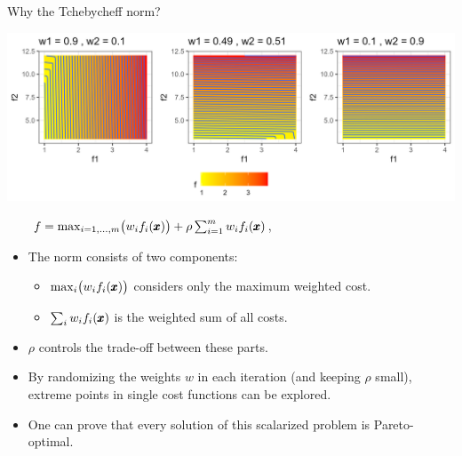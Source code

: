 \documentclass[11pt,compress,t,notes=noshow,xcolor=table]{beamer}
\begin{document}
\begin{vbframe}{Why the Tchebycheff norm?}

\begin{center}
\includegraphics[scale=0.08]{slides/11-multicrit/figure_man/parego_viz.png}
\end{center}

$\qquad f = \max_{i=1,\dots,m}\bigl(w_i f_i(\pmb{x})\bigr) 
    + \rho \sum_{i=1}^m w_i f_i(\pmb{x})$,
\begin{scriptsize}
\begin{itemize}
  \item The norm consists of two components:
    \begin{itemize}
      \item $\max_{i}\bigl(w_i f_i(\pmb{x})\bigr)$ 
            considers only the maximum weighted cost.
      \item $\sum_{i} w_if_i(\pmb{x})$ is the weighted sum of all costs.
    \end{itemize}
  \item $\rho$ controls the trade-off between these parts.
  \item By randomizing the weights $w$ in each iteration (and keeping $\rho$ small), 
        extreme points in single cost functions can be explored.
  \item One can prove that every solution of this scalarized problem is 
        Pareto-optimal.
\end{itemize}
\end{scriptsize}

\end{vbframe}
\end{document}

